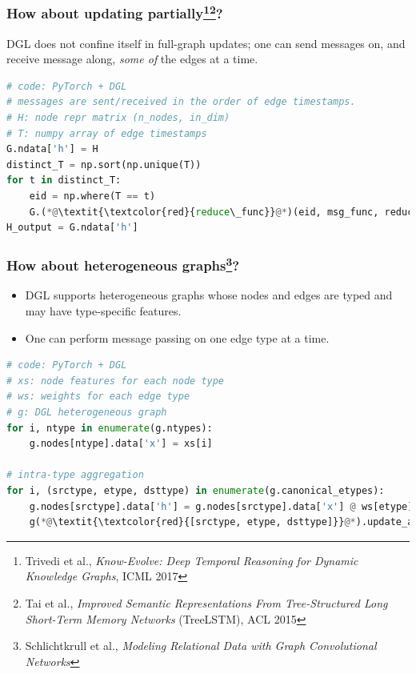 \documentclass[10pt,aspectratio=169]{beamer}
\begin{document}
	\begin{frame}[fragile]
		\frametitle{How about updating partially\footnote{Trivedi et al., \emph{Know-Evolve: Deep Temporal Reasoning for Dynamic Knowledge Graphs}, ICML 2017}\footnote{Tai et al., \emph{Improved Semantic Representations From Tree-Structured Long Short-Term Memory Networks}  (TreeLSTM), ACL 2015}?}
		DGL does not confine itself in full-graph updates; one can send messages on, and receive message along, \emph{some of} the edges at a time.
		\begin{center}
			\centering
			\begin{minipage}{0.5\textwidth}
\begin{lstlisting}[language=Python]
# code: PyTorch + DGL
# messages are sent/received in the order of edge timestamps.
# H: node repr matrix (n_nodes, in_dim)
# T: numpy array of edge timestamps
G.ndata['h'] = H
distinct_T = np.sort(np.unique(T))
for t in distinct_T:
    eid = np.where(T == t)
    G.(*@\textit{\textcolor{red}{reduce\_func}}@*)(eid, msg_func, reduce_func)
H_output = G.ndata['h']
\end{lstlisting}
			\end{minipage}
		\end{center}
	\end{frame}

	\begin{frame}[fragile]
		\frametitle{How about heterogeneous graphs\footnote{Schlichtkrull et al., \emph{Modeling Relational Data with Graph Convolutional Networks}}?}
		\begin{itemize}
			\item DGL supports heterogeneous graphs whose nodes and edges are typed and may have type-specific features.
			\item One can perform message passing on one edge type at a time.
		\end{itemize}
\begin{lstlisting}[language=Python]
# code: PyTorch + DGL
# xs: node features for each node type
# ws: weights for each edge type
# g: DGL heterogeneous graph
for i, ntype in enumerate(g.ntypes):
    g.nodes[ntype].data['x'] = xs[i]

# intra-type aggregation
for i, (srctype, etype, dsttype) in enumerate(g.canonical_etypes):
    g.nodes[srctype].data['h'] = g.nodes[srctype].data['x'] @ ws[etype]
    g(*@\textit{\textcolor{red}{[srctype, etype, dsttype]}}@*).update_all(fn.copy_u('h', 'm'), fn.mean('m', 'h_%d'))
\end{lstlisting}
	\end{frame}
\end{document}

